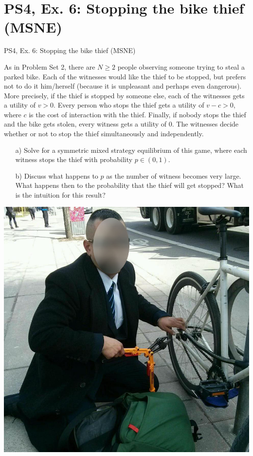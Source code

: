 \section{PS4, Ex. 6: Stopping the bike thief (MSNE)}

\begin{frame}{PS4, Ex. 6: Stopping the bike thief (MSNE)}
  \begin{multicols}{2}
    As in Problem Set 2, there are $N\geq2$ people observing someone trying to steal a parked bike. Each of the witnesses would like the thief to be stopped, but prefers not to do it him/herself (because it is unpleasant and perhaps even dangerous). More precisely, if the thief is stopped by someone else, each of the witnesses gets a utility of $v > 0$. Every person who stops the thief gets a utility of $v-c>0$, where $c$ is the cost of interaction with the thief. Finally, if nobody stops the thief and the bike gets stolen, every witness gets a utility of $0$. The witnesses decide whether or not to stop the thief simultaneously and independently.
  \vfill\null \columnbreak
    \begin{itemize}
      \item[a)] Solve for a symmetric mixed strategy equilibrium of this game, where each witness stops the thief with probability $p\in(0,1)$.
      \item[b)] Discuss what happens to $p$ as the number of witness becomes very large. What happens then to the probability that the thief will get stopped? What is the intuition for this result?
    \end{itemize}
    \includegraphics[width=\columnwidth]{figures/bike_thief}
  \vfill\null
  \end{multicols}
\end{frame}

